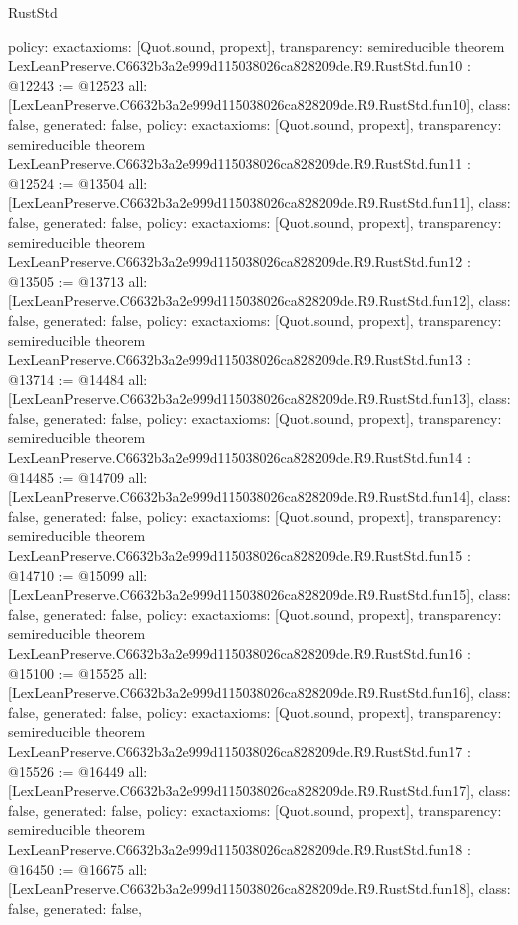 \begin{lexlean}{RustStd}
\begin{coremodule}
{  policy: exact{axioms: [Quot.sound, propext]},
  transparency: semireducible
}
theorem LexLeanPreserve.C6632b3a2e999d115038026ca828209de.R9.RustStd.fun10 : @12243 := @12523 {
  all: [LexLeanPreserve.C6632b3a2e999d115038026ca828209de.R9.RustStd.fun10],
  class: false,
  generated: false,
  policy: exact{axioms: [Quot.sound, propext]},
  transparency: semireducible
}
theorem LexLeanPreserve.C6632b3a2e999d115038026ca828209de.R9.RustStd.fun11 : @12524 := @13504 {
  all: [LexLeanPreserve.C6632b3a2e999d115038026ca828209de.R9.RustStd.fun11],
  class: false,
  generated: false,
  policy: exact{axioms: [Quot.sound, propext]},
  transparency: semireducible
}
theorem LexLeanPreserve.C6632b3a2e999d115038026ca828209de.R9.RustStd.fun12 : @13505 := @13713 {
  all: [LexLeanPreserve.C6632b3a2e999d115038026ca828209de.R9.RustStd.fun12],
  class: false,
  generated: false,
  policy: exact{axioms: [Quot.sound, propext]},
  transparency: semireducible
}
theorem LexLeanPreserve.C6632b3a2e999d115038026ca828209de.R9.RustStd.fun13 : @13714 := @14484 {
  all: [LexLeanPreserve.C6632b3a2e999d115038026ca828209de.R9.RustStd.fun13],
  class: false,
  generated: false,
  policy: exact{axioms: [Quot.sound, propext]},
  transparency: semireducible
}
theorem LexLeanPreserve.C6632b3a2e999d115038026ca828209de.R9.RustStd.fun14 : @14485 := @14709 {
  all: [LexLeanPreserve.C6632b3a2e999d115038026ca828209de.R9.RustStd.fun14],
  class: false,
  generated: false,
  policy: exact{axioms: [Quot.sound, propext]},
  transparency: semireducible
}
theorem LexLeanPreserve.C6632b3a2e999d115038026ca828209de.R9.RustStd.fun15 : @14710 := @15099 {
  all: [LexLeanPreserve.C6632b3a2e999d115038026ca828209de.R9.RustStd.fun15],
  class: false,
  generated: false,
  policy: exact{axioms: [Quot.sound, propext]},
  transparency: semireducible
}
theorem LexLeanPreserve.C6632b3a2e999d115038026ca828209de.R9.RustStd.fun16 : @15100 := @15525 {
  all: [LexLeanPreserve.C6632b3a2e999d115038026ca828209de.R9.RustStd.fun16],
  class: false,
  generated: false,
  policy: exact{axioms: [Quot.sound, propext]},
  transparency: semireducible
}
theorem LexLeanPreserve.C6632b3a2e999d115038026ca828209de.R9.RustStd.fun17 : @15526 := @16449 {
  all: [LexLeanPreserve.C6632b3a2e999d115038026ca828209de.R9.RustStd.fun17],
  class: false,
  generated: false,
  policy: exact{axioms: [Quot.sound, propext]},
  transparency: semireducible
}
theorem LexLeanPreserve.C6632b3a2e999d115038026ca828209de.R9.RustStd.fun18 : @16450 := @16675 {
  all: [LexLeanPreserve.C6632b3a2e999d115038026ca828209de.R9.RustStd.fun18],
  class: false,
  generated: false,
}
\end{coremodule}
\end{lexlean}

